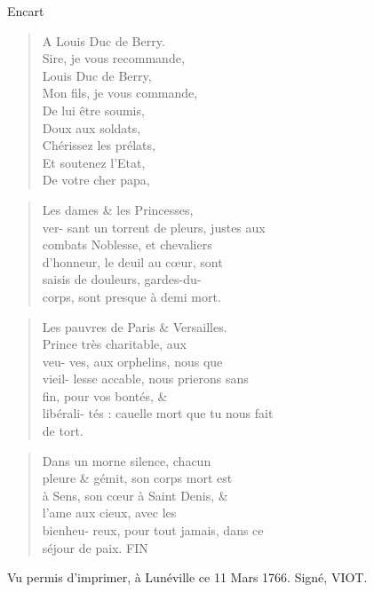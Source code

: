 \begin{diary}{Encart}{}
        \begin{verse}A Louis Duc de Berry.\\Sire, je vous recommande,\\Louis Duc de Berry,\\Mon fils, je vous commande,\\De lui être soumis,\\Doux aux soldats,\\Chérissez les prélats,\\Et soutenez l’Etat,\\De votre cher papa,\\\end{verse}
        \bigskip

        \begin{verse}Les dames \& les Princesses, \\ver-
                                    sant un torrent de pleurs, justes aux\\combats Noblesse, et chevaliers\\d'honneur, le deuil au cœur, sont\\saisis de douleurs, gardes-du-\\corps, sont presque à demi mort.\\\end{verse}
        \bigskip

        \begin{verse}Les pauvres de Paris \&
                                    Versailles.\\Prince très charitable, aux \\veu-
                                    ves, aux orphelins, nous que\\vieil-
                                    lesse accable, nous prierons sans\\fin, pour vos bontés, \& \\libérali-
                                    tés : cauelle mort que tu nous fait\\de tort.\\\end{verse}
        \bigskip

        \begin{verse}Dans un morne silence, chacun\\pleure \& gémit, son corps mort est\\à Sens, son cœur à Saint Denis, \&\\l'ame aux cieux, avec les \\bienheu-
                                    reux, pour tout jamais, dans ce\\séjour de paix. FIN\\\end{verse}
        \bigskip

         Vu permis d’imprimer, à Lunéville ce 11 Mars
                                 1766. Signé, VIOT.
                           \bigskip

        \end{diary}



